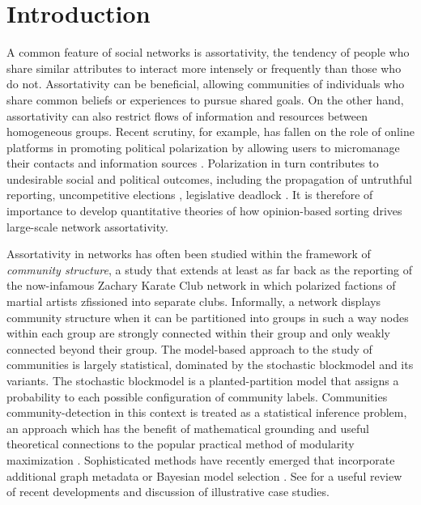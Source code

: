 \documentclass[review, onefignum, onetabnum]{siamart171218}
\begin{document}
\section{Introduction}

	A common feature of social networks is assortativity, the tendency of people who share similar attributes to interact more intensely or frequently than those who do not.
	Assortativity can be beneficial, allowing communities of individuals who share common beliefs or experiences to pursue shared goals. 
	On the other hand, assortativity can also restrict flows of information and resources between homogeneous groups. 
	Recent scrutiny, for example, has fallen on the role of online platforms in promoting political polarization by allowing users to micromanage their contacts and information sources \cite{Bakshy2015,Anagnostopoulos2014}. 
	Polarization in turn contributes to undesirable social and political outcomes, including the propagation of untruthful reporting\cite{Lazer2018}, uncompetitive elections \cite{Abramowitz2006}, legislative deadlock \cite{Layman2006}. 
	It is therefore of importance to develop quantitative theories of how opinion-based sorting drives large-scale network assortativity. 

	Assortativity in networks has often been studied within the framework of \emph{community structure}, a study that extends at least as far back as the reporting of the now-infamous Zachary Karate Club network \cite{Zachary1977} in which polarized factions of martial artists zfissioned into separate clubs.  
	Informally, a network displays community structure when it can be partitioned into groups in such a way nodes within each group are strongly connected within their group and only weakly connected beyond their group. 
	The model-based approach to the study of communities is largely statistical, dominated by the stochastic blockmodel and its variants.  
	The stochastic blockmodel is a planted-partition model that assigns a probability to each possible configuration of community labels. 
	Communities community-detection in this context is treated as a statistical inference problem, an approach which has the benefit of  mathematical grounding and useful theoretical connections to the popular practical method of modularity maximization \cite{Newman2016a}. 
	Sophisticated methods have recently emerged that incorporate additional graph metadata \cite{Peel2016,Newman2016b} or Bayesian model selection \cite{Peixoto2017a,Peixoto2017d}. 
	See \cite{Shai2017} for a useful review of recent developments and discussion of illustrative case studies. 
\end{document}
